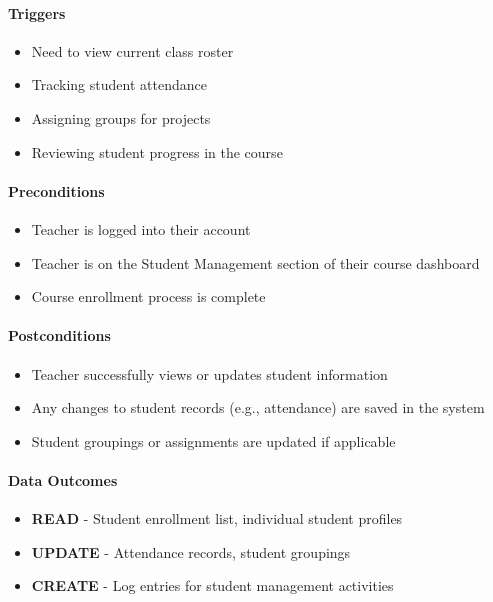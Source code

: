 \paragraph{Triggers}
\begin{itemize}
    \item Need to view current class roster
    \item Tracking student attendance
    \item Assigning groups for projects
    \item Reviewing student progress in the course
\end{itemize}

\paragraph{Preconditions}
\begin{itemize}
    \item Teacher is logged into their account
    \item Teacher is on the Student Management section of their course dashboard
    \item Course enrollment process is complete
\end{itemize}

\paragraph{Postconditions}
\begin{itemize}
    \item Teacher successfully views or updates student information
    \item Any changes to student records (e.g., attendance) are saved in the system
    \item Student groupings or assignments are updated if applicable
\end{itemize}

\paragraph{Data Outcomes}
\begin{itemize}
    \item \textbf{READ} - Student enrollment list, individual student profiles
    \item \textbf{UPDATE} - Attendance records, student groupings
    \item \textbf{CREATE} - Log entries for student management activities
\end{itemize}

